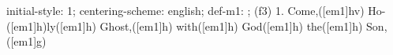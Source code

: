 initial-style: 1;
centering-scheme: english;
def-m1: \grealign;
(f3) 1. Come,([em1]hv) Ho-([em1]h)ly([em1]h) Ghost,([em1]h) with([em1]h) God([em1]h) the([em1]h) Son,([em1]g)